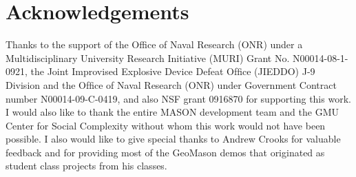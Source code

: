\documentclass[twoside,10pt]{book}
\begin{document}
\cleardoublepage %
\chapter*{Acknowledgements} %
\thispagestyle{empty} %

Thanks to the support of the Office of Naval Research (ONR) under a
Multidisciplinary University Research Initiative (MURI) Grant
No. N00014-08-1-0921, the Joint Improvised Explosive Device Defeat
Ofﬁce (JIEDDO) J-9 Division and the Ofﬁce of Naval Research (ONR)
under Government Contract number N00014-09-C-0419, and also NSF grant
0916870 for supporting this work. I would also like to thank the
entire MASON development team and the GMU Center for Social Complexity
without whom this work would not have been possible.  I also would
like to give special thanks to Andrew Crooks for valuable feedback and
for providing most of the GeoMason demos that originated as student
class projects from his classes.


\cleardoublepage
\footnotesize
{}
\printindex
\end{document}
